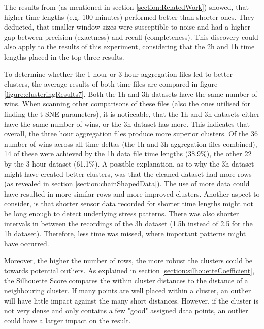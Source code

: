 The results from \textcite{AboutToEat2016Rahman} (as mentioned in section \ref{section:RelatedWork}) showed, that higher time lengths (e.g. 100 minutes) performed better than shorter ones. They deducted, that smaller window sizes were susceptible to noise and had a higher gap between precision (exactness) and recall (completeness). This discovery could also apply to the results of this experiment, considering that the 2h and 1h time lengths placed in the top three results.

To determine whether the 1 hour or 3 hour aggregation files led to better clusters, the average results of both time files are compared in figure \ref{figure:clusteringResults7}. Both the 1h and 3h datasets have the same number of wins. When scanning other comparisons of these files (also the ones utilised for finding the t-SNE parameters), it is noticeable, that the 1h and 3h datasets either have the same number of wins, or the 3h dataset has more. This indicates that overall, the three hour aggregation files produce more superior clusters. Of the 36 number of wins across all time deltas (the 1h and 3h aggregation files combined), 14 of these were achieved by the 1h data file time lengths (38.9\%), the other 22 by the 3 hour dataset (61.1\%). A possible explanation, as to why the 3h dataset might have created better clusters, was that the cleaned dataset had more rows (as revealed in section \ref{section:chainShapedData}). The use of more data could have resulted in more similar rows and more improved clusters. Another aspect to consider, is that shorter sensor data recorded for shorter time lengths might not be long enough to detect underlying stress patterns. There was also shorter intervals in between the recordings of the 3h dataset (1.5h instead of 2.5 for the 1h dataset). Therefore, less time was missed, where important patterns might have occurred.

Moreover, the higher the number of rows, the more robust the clusters could be towards potential outliers. As explained in section \ref{section:silhouetteCoefficient}, the Silhouette Score compares the within cluster distances to the distance of a neighbouring cluster. If many points are well placed within a cluster, an outlier will have little impact against the many short distances. However, if the cluster is not very dense and only contains a few "good" assigned data points, an outlier could have a larger impact on the result.

